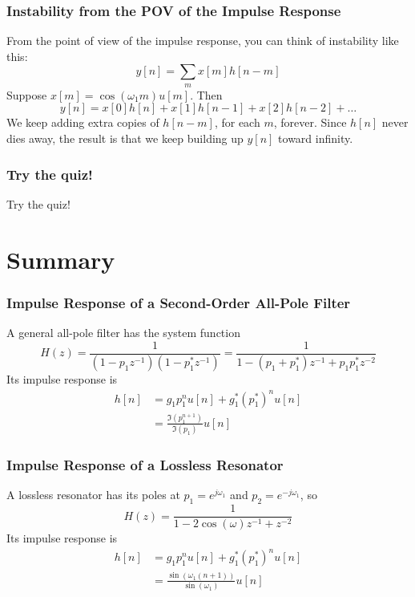 \documentclass{beamer}
\begin{document}
\begin{frame}
  \frametitle{Instability from the POV of the Impulse Response}
  From the point of view of the impulse response, you can think of instability like this:
  \[
  y[n] = \sum_m x[m]h[n-m]
  \]
  Suppose $x[m] = \cos(\omega_1 m)u[m]$.   Then
  \[
  y[n] = x[0]h[n] + x[1]h[n-1] + x[2]h[n-2] + \ldots
  \]
  We keep adding extra copies of $h[n-m]$, for each $m$, forever.
  Since $h[n]$ never dies away, the result is that we keep building up
  $y[n]$ toward infinity.
\end{frame}

\begin{frame}
  \centerline{}
\end{frame}

\begin{frame}
  \frametitle{Try the quiz!}

  Try the quiz!
\end{frame}

\section[Summary]{Summary}
\setcounter{subsection}{1}

\begin{frame}
  \frametitle{Impulse Response of a Second-Order All-Pole Filter}

  A general all-pole filter has the system function
  \[
  H(z) = \frac{1}{(1-p_1z^{-1})(1-p_1^*z^{-1})}= \frac{1}{1-(p_1+p_1^*)z^{-1}+p_1p_1^*z^{-2}}
  \]
  Its impulse response is 
  \begin{align*}
    h[n] &= g_1p_1^n u[n] + g_1^* (p_1^*)^n u[n]\\
    &= \frac{\Im(p_1^{n+1})}{\Im(p_1)} u[n]
  \end{align*}
\end{frame}

\begin{frame}
  \frametitle{Impulse Response of a Lossless Resonator}

  A lossless resonator has its poles at $p_1=e^{j\omega_1}$ and
  $p_2=e^{-j\omega_1}$, so
  \[
  H(z) = \frac{1}{1-2\cos(\omega)z^{-1}+z^{-2}}
  \]
  Its impulse response is 
  \begin{align*}
    h[n] &= g_1p_1^n u[n] + g_1^* (p_1^*)^n u[n]\\
    &= \frac{\sin(\omega_1(n+1))}{\sin(\omega_1)} u[n]
  \end{align*}
\end{frame}
\end{document}
